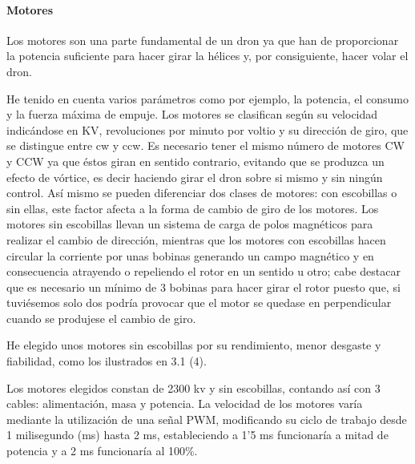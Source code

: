 
\paragraph{Motores}
\label{SSS:Motores}

Los motores son una parte fundamental de un dron ya que han de proporcionar la potencia suficiente para hacer girar la hélices y, por consiguiente, hacer volar el dron. 
                
 He tenido en cuenta varios parámetros como por ejemplo, la potencia, el consumo y la fuerza máxima de empuje. 
 Los motores se clasifican según su velocidad indicándose en KV, revoluciones por minuto por voltio y su dirección de giro, que se distingue entre \ac{cw} y \ac{ccw}. Es necesario tener el mismo número de motores CW y CCW ya que éstos giran en sentido contrario, evitando que se produzca un efecto de vórtice, es decir haciendo girar el dron sobre si mismo y sin ningún control. \linebreak Así mismo se pueden diferenciar dos clases de motores: con escobillas o sin ellas, este factor afecta a la forma de cambio de giro de los motores. Los motores sin escobillas llevan un sistema de carga de polos magnéticos para realizar el cambio de dirección, mientras que los motores con escobillas hacen circular la corriente por unas bobinas generando un campo magnético y en consecuencia atrayendo o repeliendo el rotor en un sentido u otro; cabe destacar que es necesario un mínimo de 3 bobinas para hacer girar el rotor puesto que, si tuviésemos solo dos podría provocar que el motor se quedase en perpendicular cuando se produjese el cambio de giro.

 He elegido unos motores sin escobillas por su rendimiento, menor desgaste y fiabilidad, como los ilustrados en 3.1 (4). 
% 
                
 Los motores elegidos constan de 2300 \ac{kv} y sin escobillas, contando así con 3 cables: alimentación, masa y potencia. La velocidad de los motores varía mediante la utilización de una señal PWM, modificando su ciclo de trabajo desde 1 milisegundo (ms) hasta 2 ms, estableciendo a 1'5 ms funcionaría a mitad de potencia y a 2 ms funcionaría al 100\%.
 
